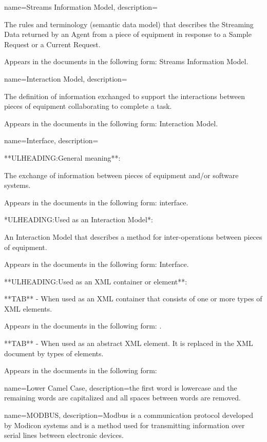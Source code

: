 {
    name={Streams Information Model},
	description={
	The rules and terminology (\gls{semantic data model}) that describes the \gls{Streaming Data} returned by an \gls{Agent} from a piece of equipment in response to a \gls{Sample Request} or a \gls{Current Request}.

	Appears in the documents in the following form: \gls{Streams Information Model}.
}
}

{
    name={Interaction Model},
	description={
	The definition of information exchanged to support the interactions between pieces of equipment collaborating to complete a task.

	Appears in the documents in the following form: \gls{Interaction Model}.
}
}

{
    name={Interface},
	description={
	**ULHEADING:General meaning**:

	The exchange of information between pieces of equipment and/or software systems.

	Appears in the documents in the following form: interface.

	*ULHEADING:Used as an \gls{Interaction Model}*:

	An \gls{Interaction Model} that describes a method for inter-operations between pieces of equipment.

	Appears in the documents in the following form: \gls{Interface}.

	**ULHEADING:Used as an XML container or element**:

	**TAB** - When used as an XML container that consists of one or more types of  XML elements.

	Appears in the documents in the following form: .

	**TAB** - When used as an abstract XML element.  It is replaced in the XML document by types of  elements.

	Appears in the documents in the following form: 
}
}

{
    name={Lower Camel Case},
	description={the first word is lowercase and the remaining words are capitalized and all spaces between words are removed.}
}

{
    name={MODBUS},
	description={Modbus is a communication protocol developed by Modicon systems and is a method used for transmitting information over serial lines between electronic devices.}
}

